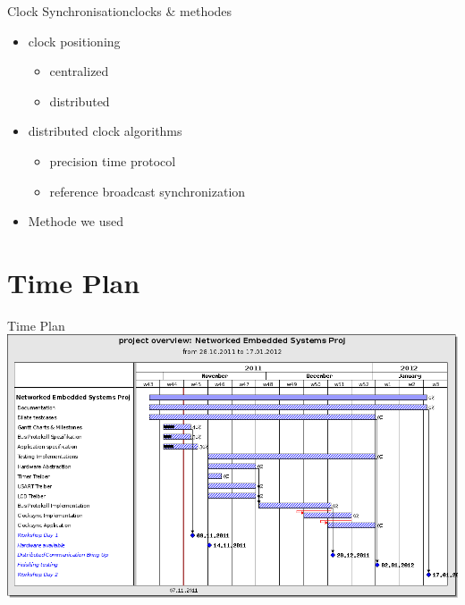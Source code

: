 \documentclass{beamer}
\begin{document}
\begin{frame}{Clock Synchronisation}{clocks \& methodes}
  \begin{center}
  \begin{itemize}
    \item \begin{large}clock positioning\end{large}
    \begin{itemize}
      \item centralized
      \item distributed
    \end{itemize}
    \item \begin{large}distributed clock algorithms\end{large}
    \begin{itemize}
      \item precision time protocol
      \item reference broadcast synchronization
    \end{itemize}
  \item \begin{large}Methode we used\end{large}
  \end{itemize}
  \end{center}
\end{frame}


\section{Time Plan}
\begin{frame}{Time Plan}
\includegraphics[width=1.0\textwidth]{./images/201111_ganttchart.png}
\vspace{1cm}
\end{frame}
\end{document}
